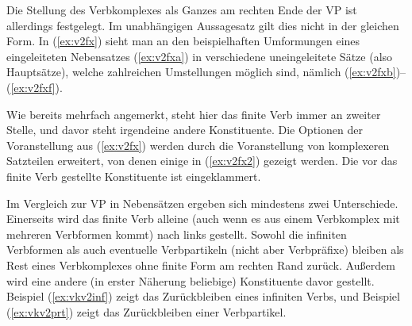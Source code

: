 \begin{exe}
  \ex\label{ex:vgrorder-rep}
  \begin{xlist}
    \ex{\ThePhrasenExOne}
    \ex{\ThePhrasenExTwo}
  \end{xlist}
\end{exe}

Die Stellung des Verbkomplexes als Ganzes am rechten Ende der VP ist allerdings festgelegt.
Im unabhängigen Aussagesatz gilt dies nicht in der gleichen Form.
In (\ref{ex:v2fx}) sieht man an den beispielhaften Umformungen eines eingeleiteten Nebensatzes (\ref{ex:v2fxa}) in verschiedene uneingeleitete Sätze (also Hauptsätze), welche zahlreichen Umstellungen möglich sind, nämlich (\ref{ex:v2fxb})--(\ref{ex:v2fxf}).

\begin{exe}
  \ex\label{ex:v2fx}
  \begin{xlist}
  \end{xlist}
\end{exe}

Wie bereits mehrfach angemerkt, steht hier das finite Verb immer an zweiter Stelle, und davor steht irgendeine andere Konstituente.
Die Optionen der Voranstellung aus (\ref{ex:v2fx}) werden durch die Voranstellung von komplexeren Satzteilen erweitert, von denen einige in (\ref{ex:v2fx2}) gezeigt werden.
Die vor das finite Verb gestellte Konstituente ist eingeklammert.

\begin{exe}
  \ex\label{ex:v2fx2}
  \begin{xlist}
  \end{xlist}
\end{exe}

Im Vergleich zur VP in Nebensätzen ergeben sich mindestens zwei Unterschiede.
Einerseits wird das finite Verb alleine (auch wenn es aus einem Verbkomplex mit mehreren Verbformen kommt) nach links gestellt.
Sowohl die infiniten Verbformen als auch eventuelle Verbpartikeln (nicht aber Verbpräfixe) bleiben als Rest eines Verbkomplexes ohne finite Form am rechten Rand zurück.
Außerdem wird eine andere (in erster Näherung beliebige) Konstituente davor gestellt.
Beispiel (\ref{ex:vkv2inf}) zeigt das Zurückbleiben eines infiniten Verbs, und Beispiel (\ref{ex:vkv2prt}) zeigt das Zurückbleiben einer Verbpartikel.


